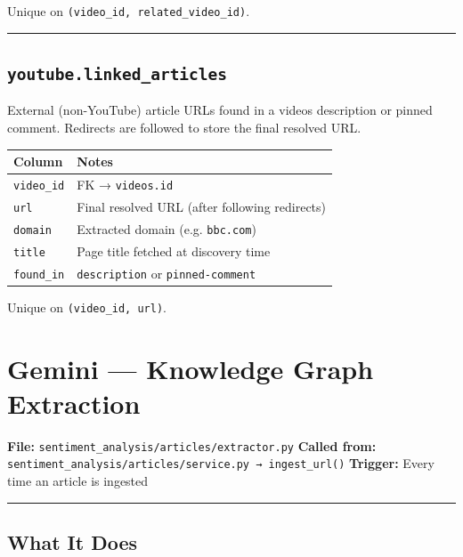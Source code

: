 \documentclass[
]{article}
\newcounter{none} %
\begin{document}
Unique on \texttt{(video\_id,\ related\_video\_id)}.

\begin{center}\rule{0.5\linewidth}{0.5pt}\end{center}

\subsection{\texorpdfstring{\texttt{youtube.linked\_articles}}{youtube.linked\_articles}}\label{youtubelinked_articles}

External (non-YouTube) article URLs found in a video\textquotesingle s
description or pinned comment. Redirects are followed to store the final
resolved URL.

{\def\LTcaptype{none} %
\begin{longtable}[]{@{}ll@{}}
\toprule\noalign{}
Column & Notes \\
\midrule\noalign{}
\endhead
\bottomrule\noalign{}
\endlastfoot
\texttt{video\_id} & FK → \texttt{videos.id} \\
\texttt{url} & Final resolved URL (after following redirects) \\
\texttt{domain} & Extracted domain (e.g. \texttt{bbc.com}) \\
\texttt{title} & Page title fetched at discovery time \\
\texttt{found\_in} & \texttt{description} or \texttt{pinned-comment} \\
\end{longtable}
}

Unique on \texttt{(video\_id,\ url)}.

\label{file-gemini-kg}
\section{Gemini --- Knowledge Graph
Extraction}\label{gemini--knowledge-graph-extraction}

\textbf{File:} \texttt{sentiment\_analysis/articles/extractor.py}
\textbf{Called from:}
\texttt{sentiment\_analysis/articles/service.py\ →\ ingest\_url()}
\textbf{Trigger:} Every time an article is ingested

\begin{center}\rule{0.5\linewidth}{0.5pt}\end{center}

\subsection{What It Does}\label{what-it-does-1}
\end{document}
